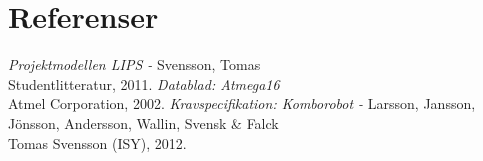 %

\section{Referenser}
\begin{thebibliography}{99}
\textit{Projektmodellen LIPS - } Svensson, Tomas
\\Studentlitteratur, 2011.
\textit{Datablad: Atmega16}
\\Atmel Corporation, 2002.
\textit{Kravspecifikation: Komborobot - } Larsson, Jansson, Jönsson, Andersson, Wallin, Svensk \& Falck
\\Tomas Svensson (ISY), 2012.
\end{thebibliography}
